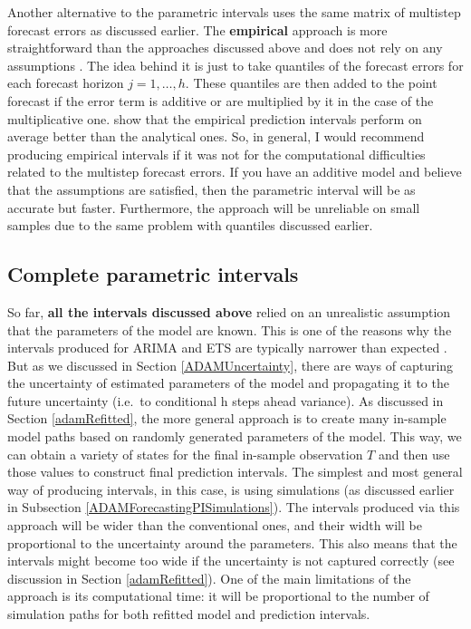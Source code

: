 \documentclass[]{book}
\theoremstyle{definition}
\theoremstyle{definition}
\theoremstyle{definition}
\theoremstyle{definition}
\theoremstyle{remark}
\begin{document}
Another alternative to the parametric intervals uses the same matrix of multistep forecast errors as discussed earlier. The \textbf{empirical} approach is more straightforward than the approaches discussed above and does not rely on any assumptions \citep[it was discussed in][]{Lee2014}. The idea behind it is just to take quantiles of the forecast errors for each forecast horizon \(j=1,\dots,h\). These quantiles are then added to the point forecast if the error term is additive or are multiplied by it in the case of the multiplicative one. \citet{Trapero2019} show that the empirical prediction intervals perform on average better than the analytical ones. So, in general, I would recommend producing empirical intervals if it was not for the computational difficulties related to the multistep forecast errors. If you have an additive model and believe that the assumptions are satisfied, then the parametric interval will be as accurate but faster. Furthermore, the approach will be unreliable on small samples due to the same problem with quantiles discussed earlier.

\hypertarget{complete-parametric-intervals}{%
\subsection{Complete parametric intervals}\label{complete-parametric-intervals}}

So far, \textbf{all the intervals discussed above} relied on an unrealistic assumption that the parameters of the model are known. This is one of the reasons why the intervals produced for ARIMA and ETS are typically narrower than expected \citep[see, for example, results of tourism competition,][]{Athanasopoulos2011}. But as we discussed in Section \ref{ADAMUncertainty}, there are ways of capturing the uncertainty of estimated parameters of the model and propagating it to the future uncertainty (i.e.~to conditional h steps ahead variance). As discussed in Section \ref{adamRefitted}, the more general approach is to create many in-sample model paths based on randomly generated parameters of the model. This way, we can obtain a variety of states for the final in-sample observation \(T\) and then use those values to construct final prediction intervals. The simplest and most general way of producing intervals, in this case, is using simulations (as discussed earlier in Subsection \ref{ADAMForecastingPISimulations}). The intervals produced via this approach will be wider than the conventional ones, and their width will be proportional to the uncertainty around the parameters. This also means that the intervals might become too wide if the uncertainty is not captured correctly (see discussion in Section \ref{adamRefitted}). One of the main limitations of the approach is its computational time: it will be proportional to the number of simulation paths for both refitted model and prediction intervals.
\end{document}
